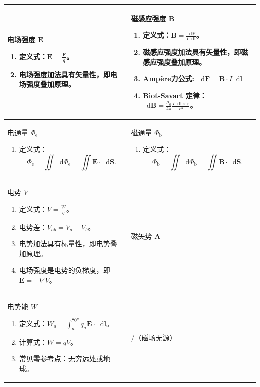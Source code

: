\documentclass[UTF8,fontset=fandol,zihao=5]{ctexart}
\newcommand{\vect}[1]{\bm{#1}}
\newcommand{\dif}{\mathop{}\!\mathrm{d}}
\begin{document}
\begin{longtable}{|>{\raggedright\arraybackslash}p{}|>{\raggedright\arraybackslash}p{}|}
\centering 电场强度 \(\vect E\)
\begin{enumerate}
  \item 定义式：\(\displaystyle\vect E=\frac{\vect F}{q}\)。
  \item 电场强度加法具有矢量性，即电场强度叠加原理。
\end{enumerate}
& \centering\arraybackslash 磁感应强度 \(\vect B\)
\begin{enumerate}
  \item 定义式：\(\displaystyle\vect B=\frac{\dif \vect F}{I \dif \vect l}\)。
  \item 磁感应强度加法具有矢量性，即磁感应强度叠加原理。
  \item Ampère力公式: \(\dif \vect F = \vect B \cdot I \dif \vect l\)
  \item Biot-Savart 定律：\(\displaystyle \dif \vect B = \frac{\mu_0}{4\pi} \frac{I \dif \vect l \times \vect r}{r^3}\)。
\end{enumerate}
\\ \hline

\centering 电通量 \(\varPhi_{\mathrm e}\)
\begin{enumerate}
  \item 定义式：
  \[
    \varPhi_{\mathrm e}=\iint\dif\varPhi_{\mathrm e}=\iint\vect E\cdot\dif\vect S.
  \]
\end{enumerate}
\vspace{0.45em}
& \centering\arraybackslash 磁通量 \(\varPhi_{\mathrm b}\)\par
\begin{enumerate}
  \item 定义式：
  \[
    \varPhi_{\mathrm b}=\iint\dif\varPhi_{\mathrm b}=\iint\vect B\cdot\dif\vect S.
  \]
\end{enumerate}\\
\hline

\centering 电势 \(V\)
\begin{enumerate}
  \item 定义式：\(\displaystyle V=\frac{W}{q}\)。
  \item 电势差：\(V_{ab}=V_a-V_b\)。
  \item 电势加法具有标量性，即电势叠加原理。
  \item 电场强度是电势的负梯度，即 \(\vect E=-\nabla V\)。
\end{enumerate}
& \centering\arraybackslash 磁矢势 \(\vect A\)\\ \hline

\centering 电势能 \(W\)
\begin{enumerate}
  \item 定义式：\(\displaystyle W_a=\int_a^{\text{``0''}}q_a\vect E\cdot\dif\vect l\)。
  \item 计算式：\(W=qV\)。
  \item 常见零参考点：无穷远处或地球。
\end{enumerate}
& \centering\arraybackslash /（磁场无源）\\ \hline


\end{longtable}
\end{document}
